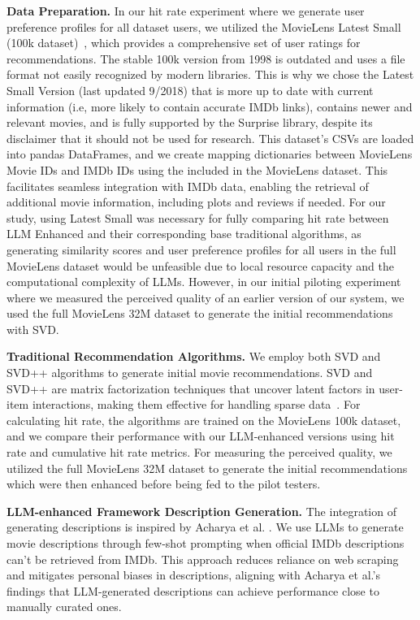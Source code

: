 \documentclass[sigconf]{acmart}
\begin{document}
\noindent
\textbf{Data Preparation.}
In our hit rate experiment where we generate user preference profiles for all dataset users, we utilized the MovieLens Latest Small (100k dataset)~\cite{harper2015movielens}, which provides a comprehensive set of user ratings for recommendations. The stable 100k version from 1998 is outdated and uses a file format not easily recognized by modern libraries. This is why we chose the Latest Small Version (last updated 9/2018) that is more up to date with current information (i.e, more likely to contain accurate IMDb links), contains newer and relevant movies, and is fully supported by the Surprise library, despite its disclaimer that it should not be used for research. This dataset's CSVs are loaded into pandas DataFrames, and we create mapping dictionaries between MovieLens Movie IDs and IMDb IDs using the  included in the MovieLens dataset. This facilitates seamless integration with IMDb data, enabling the retrieval of additional movie information, including plots and reviews if needed. For our study, using Latest Small was necessary for fully comparing hit rate between LLM Enhanced and their corresponding base traditional algorithms, as generating similarity scores and user preference profiles for all users in the full MovieLens dataset would be unfeasible due to local resource capacity and the computational complexity of LLMs. However, in our initial piloting experiment where we measured the perceived quality of an earlier version of our system, we used the full MovieLens 32M dataset to generate the initial recommendations with SVD. 

\noindent
\textbf{Traditional Recommendation Algorithms.}
We employ both SVD and SVD++ algorithms to generate initial movie recommendations. SVD and SVD++ are matrix factorization techniques that uncover latent factors in user-item interactions, making them effective for handling sparse data~\cite{koren2009matrix}. For calculating hit rate, the algorithms are trained on the MovieLens 100k dataset, and we compare their performance with our LLM-enhanced versions using hit rate and cumulative hit rate metrics. For measuring the perceived quality, we utilized the full MovieLens 32M dataset to generate the initial recommendations which were then enhanced before being fed to the pilot testers.

\noindent
\textbf{LLM-enhanced Framework Description Generation.}
The integration of generating descriptions is inspired by Acharya et al. \cite{AcharyaLLM2023}. We use LLMs to generate movie descriptions through few-shot prompting when official IMDb descriptions can't be retrieved from IMDb. This approach reduces reliance on web scraping and mitigates personal biases in descriptions, aligning with Acharya et al.'s \cite{AcharyaLLM2023} findings that LLM-generated descriptions can achieve performance close to manually curated ones. 
\end{document}
